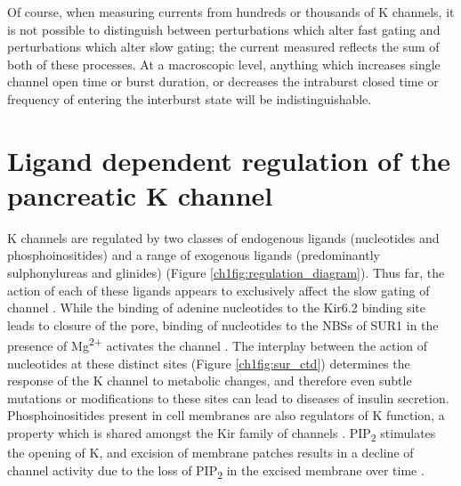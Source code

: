 Of course, when measuring currents from hundreds or thousands of K\ATP{} channels, it is not possible to distinguish between perturbations which alter fast gating and perturbations which alter slow gating; the current measured reflects the sum of both of these processes.
At a macroscopic level, anything which increases single channel open time or burst duration, or decreases the intraburst closed time or frequency of entering the interburst state will be indistinguishable.

\section{Ligand dependent regulation of the pancreatic K\ATP{} channel}

K\ATP{} channels are regulated by two classes of endogenous ligands (nucleotides and phosphoinositides) and a range of exogenous ligands (predominantly sulphonylureas and glinides) (Figure \ref{ch1fig:regulation_diagram}).
Thus far, the action of each of these ligands appears to exclusively affect the slow gating of channel \cite{proks_modeling_2009}.
While the binding of adenine nucleotides to the Kir6.2 binding site leads to closure of the pore, binding of nucleotides to the NBSs of SUR1 in the presence of Mg\textsuperscript{2+} activates the channel \cite{nichols_adenosine_1996-1, vedovato_nucleotide-binding_2015}.
The interplay between the action of nucleotides at these distinct sites (Figure \ref{ch1fig:sur_ctd}) determines the response of the K\ATP{} channel to metabolic changes, and therefore even subtle mutations or modifications to these sites can lead to diseases of insulin secretion.
Phosphoinositides present in cell membranes are also regulators of K\ATP{} function, a property which is shared amongst the Kir family of channels \cite{fan_anionic_1997, nichols_k_2006, hibino_inwardly_2010}.
PIP\textsubscript{2} stimulates the opening of K\ATP{}, and excision of membrane patches results in a decline of channel activity due to the loss of PIP\textsubscript{2} in the excised membrane over time \cite{proks_running_2016-2}.

